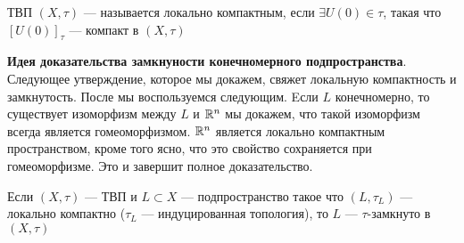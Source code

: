 \begin{definition}
	ТВП $(X, \tau)$ --- называется локально компактным, если $\exists U(0) \in \tau$, такая что $[U(0)]_\tau$ --- компакт в $(X, \tau)$
\end{definition}
\noindent \textbf{Идея доказательства замкнуности конечномерного подпространства}. \newline
Следующее утверждение, которое мы докажем, свяжет локальную компактность и замкнутость. После мы воспользуемся следующим. Eсли $L$ конечномерно, то существует изоморфизм между $L$ и $\mathbb{R}^n$ мы докажем, что такой изоморфизм всегда является гомеоморфизмом. $\mathbb{R}^n$  является локально компактным пространством, кроме того ясно, что это свойство сохраняется при гомеоморфизме. Это и завершит полное доказательство.
\begin{claim}
	\label{claim:localcompact}
	Если $(X, \tau)$ --- ТВП и $L \subset X$ --- подпространство такое что $(L, \tau_L)$ --- локально компактно ($\tau_L$ --- индуцированная топология), то $L$ --- $\tau$-замкнуто в $(X,\tau)$
\end{claim}
